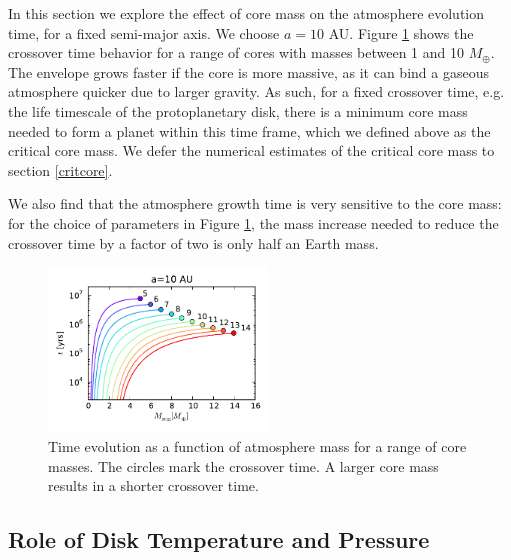 \documentclass[apj]{emulateapj}
\begin{document}
In this section we explore the effect of core mass on the atmosphere evolution time, for a fixed semi-major axis. We choose $a=10$ AU. Figure \ref{fig:tvsM} shows the crossover time behavior for a range of cores with masses between 1 and 10 $M_{\oplus}$. The envelope grows faster if the core is more massive, as it can bind a gaseous atmosphere quicker due to larger gravity. As such, for a fixed crossover time, e.g. the life timescale of the protoplanetary disk, there is a minimum core mass needed to form a planet within this time frame, which we defined above as the critical core mass. We defer the numerical estimates of the critical core mass to section \ref{critcore}.

We also find that the atmosphere growth time is very sensitive to the core mass: for the choice of parameters in Figure \ref{fig:tvsM}, the mass increase needed to reduce the crossover time by a factor of two is only half an Earth mass. 



\begin{figure}[h]
\centering
\includegraphics[width=0.52\textwidth]{../../figs/ModelAtmospheres/RadSelfGravPoly/PaperFigs/cumul_coolingtime_vs_Matm_10au_mu235.pdf}
\caption{Time evolution as a function of atmosphere mass for a range of core masses. The circles mark the crossover time. A larger core mass results in a shorter crossover time.}
\label{fig:tvsM}
\end{figure}



\subsection{Role of Disk Temperature and Pressure}
\label{TPeffects}
 
\end{document}
